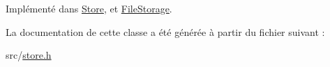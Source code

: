 Implémenté dans \hyperlink{class_store_aec754c74cf190cb55281a923db21194a}{Store}, et \hyperlink{class_file_storage_a9f680051229bda7bca2639e5464bca77}{File\+Storage}.



La documentation de cette classe a été générée à partir du fichier suivant \+:\begin{DoxyCompactItemize}
\item 
src/\hyperlink{store_8h}{store.\+h}\end{DoxyCompactItemize}
